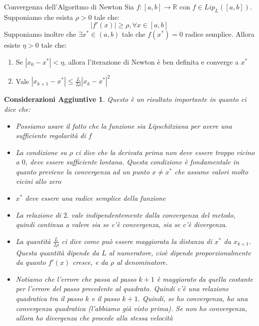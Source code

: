 \documentclass[11pt,a4paper,twoside]{article}
\newtheorem*{cons}{Considerazioni Aggiuntive}
\theoremstyle{definition}
\begin{document}
\begin{thm}{Convergenza dell'Algoritmo di Newton}{}
	Sia $f:[a,b] \to \mathbb R$ con $f \in Lip_L([a,b])$. Supponiamo che esista $\rho>0$ tale che:
	\[ |f'(x)|\geq \rho, \forall x \in [a,b] \]
	Supponiamo inoltre che $\exists x^* \in (a,b)$ tale che $f(x^*)=0$ radice semplice. Allora esiste $\eta>0$ tale che:
	\begin{enumerate}
		\item Se $|x_0 - x^*|< \eta$, allora l'iterazione di Newton è ben definita e converge a $x^*$
		\item Vale $|x_{k+1} - x^*| \leq \frac{L}{2 \rho} |x_k - x^*|^2$
	\end{enumerate}
\end{thm}
\begin{cons}
	Questo è un risultato importante in quanto ci dice che:
	\begin{itemize}
		\item Possiamo usare il fatto che la funzione sia Lipschitziana per avere una sufficiente regolarità di $f$
		\item La condizione su $\rho$ ci dice che la derivata prima non deve essere troppo vicino a $0$, deve essere sufficiente lontana. Questa condizione è fondamentale in quanto previene la convergenza ad un punto $x \neq x^*$ che assume valori molto vicini allo zero
		\item $x^*$ deve essere una radice semplice della funzione
		\item La relazione di $2.$ vale indipendentemente dalla convergenza del metodo, quindi continua a valere sia se c'è convergenza, sia se c'è divergenza.
		\item La quantità $\frac{L}{2 \rho}$ ci dice come può essere maggiorata la distanza di $x^*$ da $x_{k+1}$. Questa quantità dipende da $L$ al numeratore, cioè dipende proporzionalmente da quanto $f'(x)$ cresce, e da $\rho$ al denominatore.
		\item Notiamo che l'errore che passa al passo $k+1$ è maggiorato da quella costante per l'errore del passo precedente al quadrato. Quindi c'è una relazione quadratica tra il passo $k$ e il passo $k+1$. Quindi, se ho convergenza, ho una convergenza quadratica (l'abbiamo già visto prima). Se non ho convergenza, allora ho divergenza che procede alla stessa velocità
	\end{itemize}
\end{cons}
\end{document}
